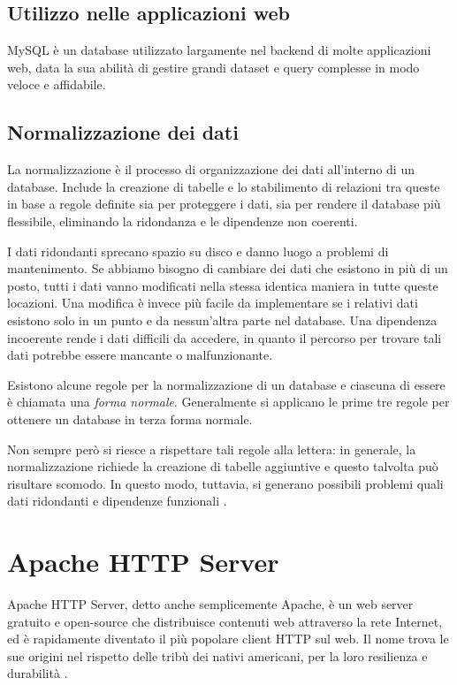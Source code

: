\subsection{Utilizzo nelle applicazioni web}
MySQL è un database utilizzato largamente nel backend di molte applicazioni web, data la sua abilità di gestire grandi dataset e query complesse in modo veloce e affidabile.

\subsection{Normalizzazione dei dati}
La normalizzazione è il processo di organizzazione dei dati all'interno di un database. Include la creazione di tabelle e lo stabilimento di relazioni tra queste in base a regole definite sia per proteggere i dati, sia per rendere il database più flessibile, eliminando la ridondanza e le dipendenze non coerenti.

I dati ridondanti sprecano spazio su disco e danno luogo a problemi di mantenimento. Se abbiamo bisogno di cambiare dei dati che esistono in più di un posto, tutti i dati vanno modificati nella stessa identica maniera in tutte queste locazioni. Una modifica è invece più facile da implementare se i relativi dati esistono solo in un punto e da nessun'altra parte nel database. Una dipendenza incoerente rende i dati difficili da accedere, in quanto il percorso per trovare tali dati potrebbe essere mancante o malfunzionante.

Esistono alcune regole per la normalizzazione di un database e ciascuna di essere è chiamata una \textit{forma normale}. Generalmente si applicano le prime tre regole per ottenere un database in terza forma normale.

Non sempre però si riesce a rispettare tali regole alla lettera: in generale, la normalizzazione richiede la creazione di tabelle aggiuntive e questo talvolta può risultare scomodo. In questo modo, tuttavia, si generano possibili problemi quali dati ridondanti e dipendenze funzionali \cite{Database_Normalization}.

\section{Apache HTTP Server}
Apache HTTP Server, detto anche semplicemente Apache, è un web server gratuito e open-source che distribuisce contenuti web attraverso la rete Internet, ed è rapidamente diventato il più popolare client HTTP sul web. Il nome trova le sue origini nel rispetto delle tribù dei nativi americani, per la loro resilienza e durabilità \cite{Apache, Apache_HTTP_Server_Docs}.

